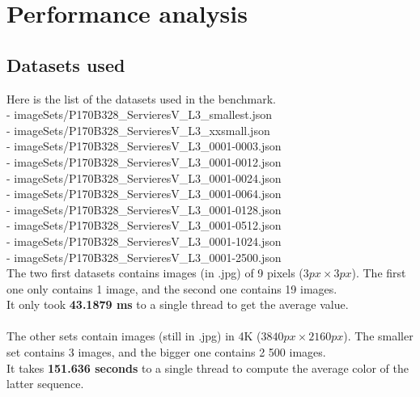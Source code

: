 \section{Performance analysis}
\subsection{Datasets used}
Here is the list of the datasets used in the benchmark.\\
- imageSets/P170B328\_ServieresV\_L3\_smallest.json\\
- imageSets/P170B328\_ServieresV\_L3\_xxsmall.json\\
- imageSets/P170B328\_ServieresV\_L3\_0001-0003.json\\
- imageSets/P170B328\_ServieresV\_L3\_0001-0012.json\\
- imageSets/P170B328\_ServieresV\_L3\_0001-0024.json\\
- imageSets/P170B328\_ServieresV\_L3\_0001-0064.json\\
- imageSets/P170B328\_ServieresV\_L3\_0001-0128.json\\
- imageSets/P170B328\_ServieresV\_L3\_0001-0512.json\\
- imageSets/P170B328\_ServieresV\_L3\_0001-1024.json\\
- imageSets/P170B328\_ServieresV\_L3\_0001-2500.json\\

The two first datasets contains images (in .jpg) of 9 pixels ($3px \times 3px$). The first one only contains 1 image, and the second one contains 19 images.\\
It only took \textbf{43.1879 ms} to a single thread to get the average value.\\
\\
The other sets contain images (still in .jpg) in 4K ($3840px \times 2160px$). The smaller set contains 3 images, and the bigger one contains 2 500 images.\\
It takes \textbf{151.636 seconds} to a single thread to compute the average color of the latter sequence.\\

